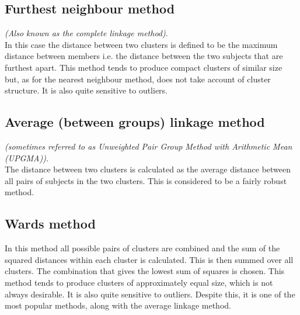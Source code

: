 \documentclass[a4paper,12pt]{report}
\begin{document}
\subsection{Furthest neighbour method}
\textit{(Also known as the complete linkage method)}.\\
In this case the distance between two clusters is defined to be the maximum distance
between members  i.e. the distance between the two subjects that are furthest apart.
This method tends to produce compact clusters of similar size but, as for the nearest
neighbour method, does not take account of cluster structure. It is also quite sensitive
to outliers.


\subsection{Average (between groups) linkage method }
\textit{(sometimes referred to as Unweighted Pair Group Method with Arithmetic Mean (UPGMA)).}\\
The distance between two clusters is calculated as the average distance between all pairs
of subjects in the two clusters. This is considered to be a fairly robust method.


\subsection{Wards method}
In this method all possible pairs of clusters are combined and the sum of the squared
distances within each cluster is calculated. This is then summed over all clusters. The
combination that gives the lowest sum of squares is chosen. This method tends to
produce clusters of approximately equal size, which is not always desirable. It is also
quite sensitive to outliers. Despite this, it is one of the most popular methods, along
with the average linkage method.

%
%
%
%
%
\end{document}
